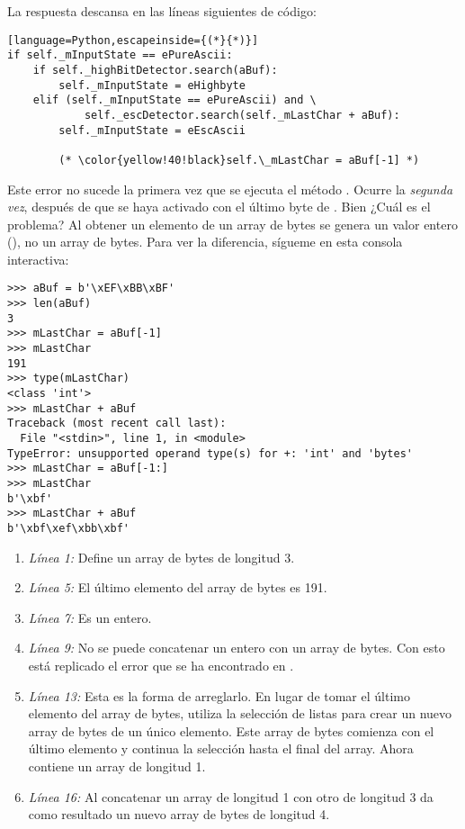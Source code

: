 La respuesta descansa en las líneas siguientes de código:

\begin{lstlisting}[language=Python,escapeinside={(*}{*)}]
if self._mInputState == ePureAscii:
    if self._highBitDetector.search(aBuf):
        self._mInputState = eHighbyte
    elif (self._mInputState == ePureAscii) and \
            self._escDetector.search(self._mLastChar + aBuf):
        self._mInputState = eEscAscii

        (* \color{yellow!40!black}self.\_mLastChar = aBuf[-1] *)
\end{lstlisting}


Este error no sucede la primera vez que se ejecuta el método . Ocurre la \emph{segunda vez}, después de que  se haya activado con el último byte de . Bien ¿Cuál es el problema? Al obtener un elemento de un array de bytes se genera un valor entero (), no un array de bytes. Para ver la diferencia, sígueme en esta consola interactiva:

\begin{lstlisting}[breaklines=true]
>>> aBuf = b'\xEF\xBB\xBF'
>>> len(aBuf)
3
>>> mLastChar = aBuf[-1]
>>> mLastChar            
191
>>> type(mLastChar)      
<class 'int'>
>>> mLastChar + aBuf    
Traceback (most recent call last):
  File "<stdin>", line 1, in <module>
TypeError: unsupported operand type(s) for +: 'int' and 'bytes'
>>> mLastChar = aBuf[-1:]
>>> mLastChar
b'\xbf'
>>> mLastChar + aBuf    
b'\xbf\xef\xbb\xbf'
\end{lstlisting}

\begin{enumerate}
  \item \emph{Línea 1:} Define un array de bytes de longitud 3.
  \item \emph{Línea 5:} El último elemento del array de bytes es 191.
  \item \emph{Línea 7:} Es un entero.
  \item \emph{Línea 9:} No se puede concatenar un entero con un array de bytes. Con esto está replicado el error que se ha encontrado en .
  \item \emph{Línea 13:} Esta es la forma de arreglarlo. En lugar de tomar el último elemento del array de bytes, utiliza la selección de listas para crear un nuevo array de bytes de un único elemento. Este array de bytes comienza con el último elemento y continua la selección hasta el final del array. Ahora  contiene un array de longitud 1.
  \item \emph{Línea 16:} Al concatenar un array de longitud 1 con otro de longitud 3 da como resultado un nuevo array de bytes de longitud 4.
\end{enumerate}

